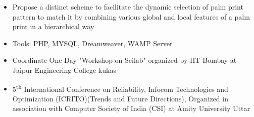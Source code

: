 \documentclass[10pt,a4paper,ragged2e,withhyper]{altacv}
\begin{document}
\begin{paracol}{2}
\divider

\begin{itemize}
\item Propose a distinct scheme to facilitate the dynamic selection of palm print pattern to match it by combining various global and local features of a palm print in a hierarchical way
\item Tools: PHP, MYSQL, Dreamweaver, WAMP Server
\end{itemize}


{}

\begin{itemize}
\item Coordinate One Day "Workshop on Scilab" organized by IIT Bombay at Jaipur Engineering College kukas
\end{itemize}
\begin{itemize}
\item 5\textsuperscript{th} International Conference on Reliability, Infocom Technologies and Optimization (ICRITO)(Trends and Future Directions), Organized in association with Computer Society of India (CSI) at Amity University Uttar
\end{itemize}


\divider


\end{paracol}
\end{document}
